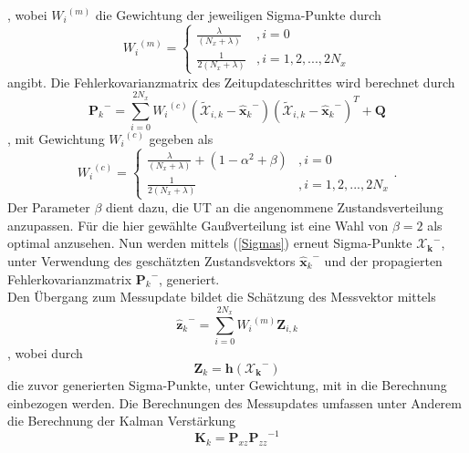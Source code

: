 , wobei ${W_i}^{(m)}$ die Gewichtung der jeweiligen Sigma-Punkte durch
\begin{equation}\label{Wim}
    {W_i}^{(m)} =
    \begin{cases}
        \frac{\lambda} {(N_x+\lambda)} & , i=0 \\
        \frac{1} {2(N_x+\lambda)} & , i=1,2,...,2N_x
    \end{cases}
\end{equation}
angibt. Die Fehlerkovarianzmatrix des Zeitupdateschrittes wird berechnet durch
\begin{equation}\label{Pk-ukf}
  {\mathbf{P}_k}^- = \sum_{i=0}^{2N_x} {{W_i}^{(c)}(\mathbf{\tilde {\mathcal{X}}}_{i,k} - {\mathbf{\hat x}_k}^-){(\mathbf{\tilde {\mathcal{X}}}_{i,k} - {\mathbf{\hat x}_k}^-)}^T} + \mathbf{Q}
\end{equation}
, mit Gewichtung ${W_i}^{(c)}$ gegeben als
\begin{equation}\label{Wic}
  {W_i}^{(c)} =
  \begin{cases}
      \frac{\lambda} {(N_x+\lambda)} + (1-\alpha^2+\beta) & , i=0 \\
      \frac{1} {2(N_x+\lambda)} & , i=1,2,...,2N_x
  \end{cases} .
\end{equation}
Der Parameter $\beta$ dient dazu, die UT an die angenommene Zustandsverteilung anzupassen. Für die hier gewählte Gaußverteilung ist eine Wahl von $\beta = 2$ als optimal anzusehen.
Nun werden mittels (\ref{Sigmas}) erneut Sigma-Punkte $\mathbf{\mathcal{X}_k}^-$, unter Verwendung des geschätzten Zustandsvektors ${\mathbf{\hat x}_k}^-$ und der propagierten Fehlerkovarianzmatrix ${\mathbf{P}_k}^-$, generiert.
\\Den Übergang zum Messupdate bildet die Schätzung des Messvektor mittels
\begin{equation}\label{zk_hat-}
    {\mathbf{\hat z}_k}^- = \sum_{i=0}^{2N_x} {{W_i}^{(m)}\mathbf{Z}_{i,k}}
\end{equation}
, wobei durch
\begin{equation}\label{Zk}
    \mathbf{Z}_k = \mathbf{h}(\mathbf{\mathcal{X}_k}^-)
\end{equation}
die zuvor generierten Sigma-Punkte, unter Gewichtung, mit in die Berechnung einbezogen werden.
Die Berechnungen des Messupdates umfassen unter Anderem die Berechnung der Kalman Verstärkung
\begin{equation}\label{Kukf}
    \mathbf{K}_k = \mathbf{P}_{xz}{\mathbf{P}_{zz}}^{-1}
\end{equation}
